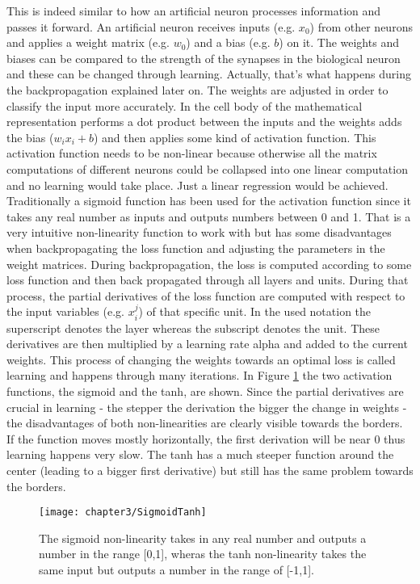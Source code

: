 This is indeed similar to how an artificial neuron processes information and passes it forward. An artificial neuron receives inputs (e.g. $x_0$) from other neurons and applies a weight matrix (e.g. $w_0$) and a bias (e.g. $b$) on it. The weights and biases can be compared to the strength of the synapses in the biological neuron and these can be changed through learning. Actually, that's what happens during the backpropagation explained later on. The weights are adjusted in order to classify the input more accurately. In the cell body of the mathematical representation performs a dot product between the inputs and the weights adds the bias ($w_i x_i + b$) and then applies some kind of activation function. This activation function needs to be non-linear because otherwise all the matrix computations of different neurons could be collapsed into one linear computation and no learning would take place. Just a linear regression would be achieved.
Traditionally a sigmoid function has been used for the activation function since it takes any real number as inputs and outputs numbers between 0 and 1. That is a very intuitive non-linearity function to work with but has some disadvantages when backpropagating the loss function and adjusting the parameters in the weight matrices.  During backpropagation, the loss is computed according to some loss function and then back propagated through all layers and units. During that process, the partial derivatives of the loss function are computed with respect to the input variables (e.g. $x_i^j$) of that specific unit. In the used notation the superscript denotes the layer whereas the subscript denotes the unit. These derivatives are then multiplied by a learning rate alpha and added to the current weights. This process of changing the weights towards an optimal loss is called learning and happens through many iterations. In Figure \ref{fig:SigmoidTanh} the two activation functions, the sigmoid and the tanh, are shown. Since the partial derivatives are crucial in learning - the stepper the derivation the bigger the change in weights - the disadvantages of both non-linearities are clearly visible towards the borders. If the function moves mostly horizontally, the first derivation will be near 0 thus learning happens very slow. The tanh has a much steeper function around the center (leading to a bigger first derivative) but still has the same problem towards the borders.

\begin{figure}[H]
  \centering
  \caption{The sigmoid non-linearity takes in any real number and outputs a number in the range [0,1], wheras the tanh non-linearity takes the same input but outputs a number in the range of [-1,1]. \cite{cs231neuralnetworks}}
  \texttt{[image: chapter3/SigmoidTanh]}
  \label{fig:SigmoidTanh}
\end{figure}

